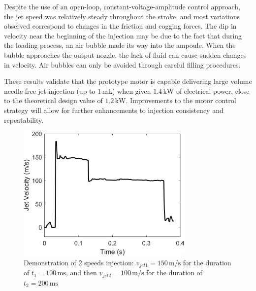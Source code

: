             Despite the use of an open-loop, constant-voltage-amplitude control approach, the jet speed was relatively steady throughout the stroke, and most variations observed correspond to changes in the friction and cogging forces. The dip in velocity near the beginning of the injection may be due to the fact that during the loading process, an air bubble made its way into the ampoule. When the bubble approaches the output nozzle, the lack of fluid can cause sudden changes in velocity. Air bubbles can only be avoided through careful filling procedures.
            
            
            These results validate that the prototype motor is capable delivering large volume needle free jet injection (up to $1\,\mathrm{mL}$) when given $1.4\,\mathrm{kW}$ of electrical power, close to the theoretical design value of $1.2\,\mathrm{kW}$. Improvements to the motor control strategy will allow for further enhancements to injection consistency and repeatability.
            
    
            \begin{figure}[h]
            	\centering
            	\includegraphics[width=3.4in]{chap5/images/injection_velocity_waveform_2_phase.png}
                \caption{Demonstration of 2 speeds injection: $v_{jet1}=150\,\mathrm{m/s}$ for the duration of $t_1=100\,\mathrm{ms}$, and then $v_{jet2}=100\,\mathrm{m/s}$ for the duration of $t_2=200\,\mathrm{ms}$}
                \label{fig:chap/experiment/injection_test/injection_velocity_waveform_2_phase}
            \end{figure}
        
